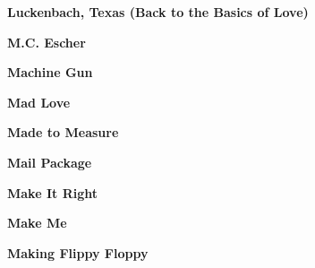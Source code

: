 \newline
\vspace{10pt} 
\begin{center}\textbf{Luckenbach, Texas (Back to the Basics of Love)}\end{center}
\newline
\vspace{10pt} 
\begin{center}\textbf{M.C. Escher}\end{center}
\newline
\vspace{10pt} 
\begin{center}\textbf{Machine Gun}\end{center}
\newline
\vspace{10pt} 
\begin{center}\textbf{Mad Love}\end{center}
\newline
\vspace{10pt} 
\begin{center}\textbf{Made to Measure}\end{center}
\newline
\vspace{10pt} 
\begin{center}\textbf{Mail Package}\end{center}
\newline
\vspace{10pt} 
\begin{center}\textbf{Make It Right}\end{center}
\newline
\vspace{10pt} 
\begin{center}\textbf{Make Me}\end{center}
\newline
\vspace{10pt} 
\begin{center}\textbf{Making Flippy Floppy}\end{center}
\newline
\vspace{10pt} 
